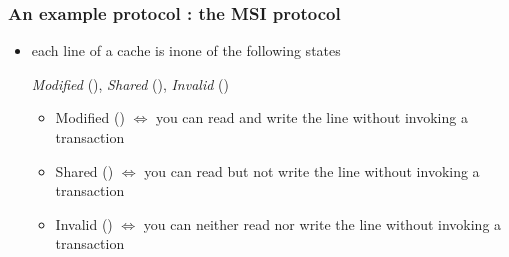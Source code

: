 \documentclass[12pt,dvipdfmx]{beamer}
\newcommand{\ao}[1]{{\color{blue}#1}}
\begin{document}
\begin{frame}
\frametitle{An example protocol : the MSI protocol}
\begin{itemize}
\item<1-> each line of a cache is inone of the following states

  \begin{center}
  {\em Modified} (\Mbox), {\em Shared} (\Shbox), {\em Invalid} (\Ibox)
  \end{center}
  
  \begin{itemize}
  \item<2-> Modified (\Mbox) $\iff$ you can \ao{read and write} the line without invoking a transaction
  \item<2-> Shared (\Shbox) $\iff$ you can \ao{read but not write} the line without invoking a transaction
  \item<2-> Invalid (\Ibox) $\iff$ you can \ao{neither read nor write} the line without invoking a transaction
  \end{itemize}
\end{itemize}
\end{frame}
\end{document}

